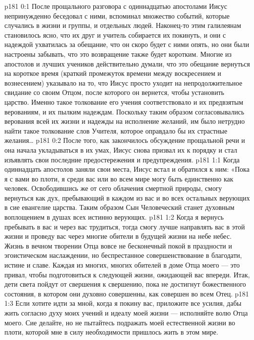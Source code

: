 \author{Комиссия срединников}
\vs p181 0:1 После прощального разговора с одиннадцатью апостолами Иисус непринужденно беседовал с ними, вспоминал множество событий, которые случались в жизни и группы, и отдельных людей. Наконец\hyp{}то этим галилеянам становилось ясно, что их друг и учитель собирается их покинуть, и они с надеждой ухватилась за обещание, что он скоро будет с ними опять, но они были настроены забывать, что это возвращение также будет коротким. Многие из апостолов и лучших учеников действительно думали, что это обещание вернуться на короткое время (краткий промежуток времени между воскресением и вознесением) указывало на то, что Иисус просто уходит на непродолжительное свидание со своим Отцом, после которого он вернется, чтобы установить царство. Именно такое толкование его учения соответствовало и их предвзятым верованиям, и их пылким надеждам. Поскольку таким образом согласовывались верования всей их жизни и надежды на исполнение желаний, им было нетрудно найти такое толкование слов Учителя, которое оправдало бы их страстные желания\ldots
\vs p181 0:2 После того, как закончилось обсуждение прощальной речи и она начала укладываться в их умах, Иисус снова призвал их к порядку и стал изъявлять свои последние предостережения и предупреждения.
\vs p181 1:1 Когда одиннадцать апостолов заняли свои места, Иисус встал и обратился к ним: «Пока я с вами во плоти, я среди вас или во всем мире могу быть единственно как человек. Освободившись же от сего облачения смертной природы, смогу вернуться как дух, пребывающий в каждом из вас и во всех остальных верующих в сие евангелие царства. Таким образом Сын Человеческий станет духовным воплощением в душах всех истинно верующих.
\vs p181 1:2 Когда я вернусь пребывать в вас и через вас трудиться, тогда смогу лучше направлять вас в этой жизни и проведу вас через многие обители в будущей жизни на небе небес. Жизнь в вечном творении Отца вовсе не бесконечный покой в праздности и эгоистическом наслаждении, но беспрестанное совершенствование в благодати, истине и славе. Каждая из многих, многих обителей в доме Отца моего --- это привал, чтобы подготовиться к следующей жизни, ожидающей вас впереди. Итак, дети света пойдут от свершения к свершению, пока не достигнут божественного состояния, в котором они духовно совершенны, как совершен во всем Отец.
\vs p181 1:3 Если хотите идти за мной, когда я покину вас, приложите все усилия, дабы жить согласно духу моих учений и идеалу моей жизни --- исполняйте волю Отца моего. Сие делайте, но не пытайтесь подражать моей естественной жизни во плоти, которой мне в силу необходимости пришлось жить в этом мире.

